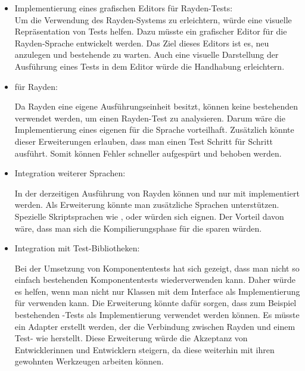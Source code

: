 \begin{itemize}
\item Implementierung eines grafischen Editors für Rayden-Tests:\\

Um die Verwendung des Rayden-Systems zu erleichtern, würde eine visuelle Repräsentation von Tests helfen. Dazu müsste ein grafischer Editor für die Rayden-Sprache entwickelt werden. Das Ziel dieses Editors ist es, neu  anzulegen und bestehende zu warten. Auch eine visuelle Darstellung der Ausführung eines Tests in dem Editor würde die Handhabung erleichtern.\\

\item {} für Rayden:

Da Rayden eine eigene Ausführungseinheit besitzt, können keine bestehenden  verwendet werden, um einen Rayden-Test zu analysieren. Darum wäre die Implementierung eines eigenen  für die Sprache vorteilhaft. Zusätzlich könnte dieser Erweiterungen erlauben, dass man einen Test Schritt für Schritt ausführt. Somit können Fehler schneller aufgespürt und behoben werden.\\

\item Integration weiterer Sprachen:

In der derzeitigen Ausführung von Rayden können  und  nur mit  implementiert werden. Als Erweiterung könnte man zusätzliche Sprachen unterstützen. Spezielle Skriptsprachen wie ,  oder  würden sich eignen. Der Vorteil davon wäre, dass man sich die Kompilierungsphase für die  sparen würden. \\

\item Integration mit Test-Bibliotheken:

Bei der Umsetzung von Komponententests hat sich gezeigt, dass man nicht so einfach bestehenden Komponententests wiederverwenden kann. Daher würde es helfen, wenn man nicht nur Klassen mit dem Interface  als Implementierung für  verwenden kann. Die Erweiterung könnte dafür sorgen, dass zum Beispiel bestehenden -Tests als Implementierung verwendet werden können. Es müsste ein Adapter erstellt werden, der die Verbindung zwischen Rayden und einem Test- wie  herstellt. Diese Erweiterung würde die Akzeptanz von Entwicklerinnen und Entwicklern steigern, da diese weiterhin mit ihren gewohnten Werkzeugen arbeiten können. 

\end{itemize}

